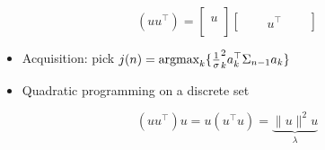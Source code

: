 $$
\left(u u^{\top}\right)=
\begin{bmatrix}
    \\
    u
    \\ 
    \\
\end{bmatrix}
\begin{bmatrix}
  \quad  & u^\top & \quad
\end{bmatrix}
$$

\begin{itemize}
    \item Acquisition: pick $j(n)=\textnormal{argmax}_k \{\frac1\sigma_k^2 a_k^\top \Sigma_{n-1} a_k\}$
    \item Quadratic programming on a discrete set
\end{itemize}

\begin{equation}
\left(u u^{\top}\right) u=u\left(u^{\top} u\right)=\underbrace{\|u\|^2 u}_\lambda
\end{equation}
